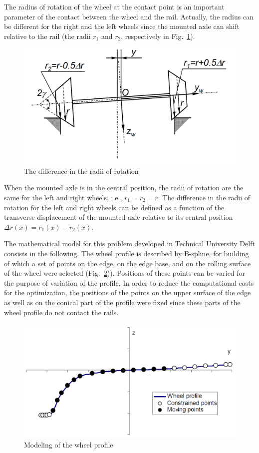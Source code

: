 The radius of rotation of the wheel at the contact point is an important parameter of the contact between the wheel and the rail. Actually, the radius can be different for the right and the left wheels since the mounted axle can shift relative to the rail (the radii $r_1$ and $r_2$, respectively in Fig.~\ref{8_fig_2}).

\begin{figure}[t]
\includegraphics[width=0.7\linewidth]{figures/8_2.png}
\caption{The difference in the radii of rotation}
\label{8_fig_2}     
\end{figure}

When the mounted axle is in the central position, the radii of rotation are the same for the left and right wheels, i.e., $r_1=r_2=r$. The difference in the radii of rotation for the left and right wheels can be defined as a function of the transverse displacement of the mounted axle relative to its central position $\Delta r(x)=r_1(x)-r_2(x)$.

The mathematical model for this problem developed in Technical University Delft consists in the following. The wheel profile is described by B-spline, for building of which a set of points on the edge, on the edge base, and on the rolling surface of the wheel were selected (Fig.~\ref{8_fig_3})). Positions of these points can be varied for the purpose of variation of the profile. In order to reduce the computational costs for the optimization, the positions of the points on the upper surface of the edge as well as on the conical part of the profile were fixed since these parts of the wheel profile do not contact the rails.

\begin{figure}[t]
\includegraphics[width=0.7\linewidth]{figures/8_3.png}
\caption{Modeling of the wheel profile}
\label{8_fig_3}     
\end{figure}

